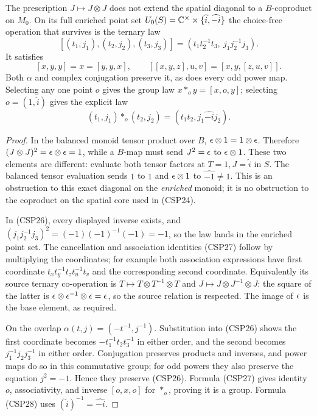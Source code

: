 \begin{proposition}\label{prop:heap}
The prescription $J\mapsto J\otimes J$ does not extend the spatial
diagonal to a $B$-coproduct on $M_0$.  On its full enriched point
set $U_0(S)=\mathbb C^\times\times\{\widehat i,\widehat{-i}\}$ the
choice-free operation that survives is the ternary law
\begin{equation}\tag{CSP26}
 [(t_1,j_1),(t_2,j_2),(t_3,j_3)]
       =(t_1t_2^{-1}t_3,\ j_1j_2^{-1}j_3).
\end{equation}
It satisfies
\begin{equation}\tag{CSP27}
 [x,y,y]=x=[y,y,x],\qquad
 [[x,y,z],u,v]=[x,y,[z,u,v]].
\end{equation}
Both $\alpha$ and complex conjugation preserve it, as does every
odd power map.  Selecting any one point $o$ gives the group law
$x*_oy=[x,o,y]$; selecting $o=(1,\widehat i)$ gives the explicit
law
\begin{equation}\tag{CSP28}
 (t_1,j_1)*_o(t_2,j_2)=(t_1t_2,j_1\widehat{-i}j_2).
\end{equation}
\end{proposition}
\begin{proof}
In the balanced monoid tensor product over $B$, $\epsilon\otimes1=
1\otimes\epsilon$.  Therefore
$(J\otimes J)^2=\epsilon\otimes\epsilon=1$, while a $B$-map must
send $J^2=\epsilon$ to $\epsilon\otimes1$.  These two elements are
different: evaluate both tensor factors at $T=1,J=\widehat i$
in $S$.  The balanced tensor evaluation sends $1$ to $1$ and
$\epsilon\otimes1$ to $\widehat{-1}\ne1$.  This is an obstruction
to this exact diagonal on the \emph{enriched} monoid; it is no
obstruction to the coproduct on the spatial core used in (CSP24).

In (CSP26), every displayed inverse exists, and
$(j_1j_2^{-1}j_3)^2=(-1)(-1)^{-1}(-1)=-1$, so the law lands in
the enriched point set.  The cancellation and association identities
(CSP27) follow by multiplying the coordinates; for example both
association expressions have first coordinate
$t_xt_y^{-1}t_zt_u^{-1}t_v$ and the corresponding second coordinate.
Equivalently its source ternary co-operation is
$T\mapsto T\otimes T^{-1}\otimes T$ and
$J\mapsto J\otimes J^{-1}\otimes J$: the square of the latter is
$\epsilon\otimes\epsilon^{-1}\otimes\epsilon=\epsilon$, so the source relation
is respected.  The image of $\epsilon$ is the base element, as required.

On the overlap $\alpha(t,j)=(-t^{-1},j^{-1})$.  Substitution into
(CSP26) shows the first coordinate becomes
$-t_1^{-1}t_2t_3^{-1}$ in either order, and the second becomes
$j_1^{-1}j_2j_3^{-1}$ in either order.  Conjugation preserves products
and inverses, and power maps do so in this commutative group; for
odd powers they also preserve the equation $j^2=-1$.  Hence they
preserve (CSP26).  Formula (CSP27) gives identity $o$, associativity,
and inverse $[o,x,o]$ for $*_o$, proving it is a group.  Formula
(CSP28) uses $(\widehat i)^{-1}=\widehat{-i}$.
\end{proof}

